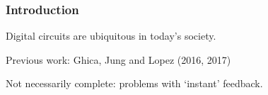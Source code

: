 \begin{frame}
    \frametitle{Introduction}

    Digital circuits are ubiquitous in today's society.

    \pause

    \alert{Previous work:} Ghica, Jung and Lopez (2016, 2017)

    \pause

    Not necessarily \alert{complete}: problems with `instant' feedback.

\end{frame}